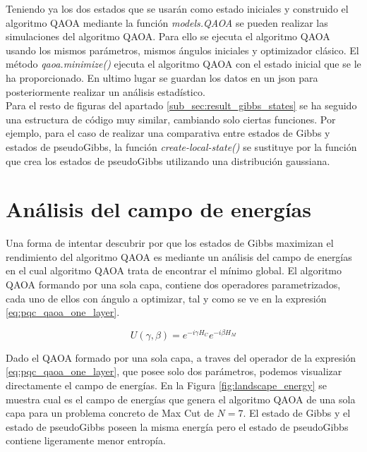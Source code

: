 Teniendo ya los dos estados que se usarán como estado iniciales y construido el algoritmo QAOA mediante la función \textit{models.QAOA} se pueden realizar las simulaciones del algoritmo QAOA. Para ello se ejecuta el algoritmo QAOA usando los mismos parámetros, mismos ángulos iniciales y optimizador clásico. El método \textit{qaoa.minimize()} ejecuta el algoritmo QAOA con el estado inicial que se le ha proporcionado. En ultimo lugar se guardan los datos en un json para posteriormente realizar un análisis estadístico. \\

Para el resto de figuras del apartado \ref{sub_sec:result_gibbs_states} se ha seguido una estructura de código muy similar, cambiando solo ciertas funciones. Por ejemplo, para el caso de realizar una comparativa entre estados de Gibbs y estados de pseudoGibbs, la función \textit{create-local-state()} se sustituye por la función que crea los estados de pseudoGibbs utilizando una distribución gaussiana.



\section{Análisis del campo de energías}
\label{apendix:energy_landscape}

Una forma de intentar descubrir por que los estados de Gibbs maximizan el rendimiento del algoritmo QAOA es mediante un análisis del campo de energías en el cual algoritmo QAOA trata de encontrar el mínimo global. El algoritmo QAOA formando por una sola capa, contiene dos operadores parametrizados, cada uno de ellos con ángulo a optimizar, tal y como se ve en la expresión \ref{eq:pqc_qaoa_one_layer}.


\begin{equation}
    U(\gamma,\beta)= e^{-i \gamma H_C} e^{- i \beta H_M}
    \label{eq:pqc_qaoa_one_layer}
\end{equation}

Dado el QAOA formado por una sola capa, a traves del operador de la expresión \ref{eq:pqc_qaoa_one_layer}, que posee solo dos parámetros, podemos visualizar directamente el campo de energías. En la Figura \ref{fig:landscape_energy} se muestra cual es el campo de energías que genera el algoritmo QAOA de una sola capa para un problema concreto de Max Cut de $N=7$. El estado de Gibbs y el estado de pseudoGibbs poseen la misma energía pero el estado de pseudoGibbs contiene ligeramente menor entropía. \\


